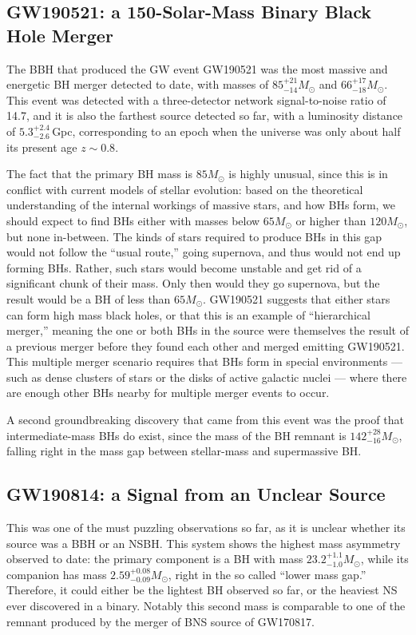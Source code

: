 \documentclass[binding=0.6cm, LaM]{sapthesis}
\begin{document}
\subsection{GW190521: a 150-Solar-Mass Binary Black Hole Merger}
	The BBH that produced the GW event GW190521 was the most massive and energetic BH merger detected to date, 
	with masses of $85^{+21}_{-14}M_{\odot}$ and  $66^{+17}_{-18}M_{\odot}$.
	This event was detected with a three-detector network signal-to-noise ratio of 14.7, 
	and it is also the farthest source detected so far, with a luminosity distance of $5.3^{+2.4}_{-2.6}\,$Gpc,
	corresponding to an epoch when the universe was only about half its present age $z \sim 0.8$.

	The fact that the primary BH mass is $85 M_{\odot}$ is highly unusual, 
	since this is in conflict with current models of stellar evolution:
	based on the theoretical understanding of the internal workings of massive stars, 
	and how BHs form, we should expect to find BHs
	either with masses below $65M_\odot$ or higher than $120M_{\odot}$, but none in-between.
	The kinds of stars required to produce BHs in this gap would not follow the ``usual route,''
	going supernova, and thus would not end up forming BHs. 
	Rather, such stars would become unstable and get rid of a significant chunk of their mass. 
	Only then would they go supernova, but the result would be a BH of less than $65 M_\odot$.
	GW190521 suggests that either stars can form high mass black holes, 
	or that this is an example of ``hierarchical merger,'' 
	meaning the one or both BHs in the source were themselves the result of 
	a previous merger before they found each other and merged emitting GW190521.
	This multiple merger scenario requires that BHs form in special environments
        --- such as dense clusters of stars or the disks of active galactic nuclei --- 
	where there are enough other BHs nearby for multiple merger events to occur.

	A second groundbreaking discovery that came from this event 
	was the proof that intermediate-mass BHs do exist,
	since the mass of the BH remnant is $142^{+28}_{-16}M_\odot$, 
	falling right in the mass gap between stellar-mass and supermassive BH.

\subsection{GW190814: a Signal from an Unclear Source}
\label{subsec:GW190814}
	This was one of the must puzzling observations so far, as it is unclear
	whether its source was a BBH or an NSBH.
	This system shows the highest mass asymmetry observed to date:
	the primary component is a BH with mass $23.2^{+1.1}_{-1.0}M_\odot$, 
	while its companion has mass $2.59^{+0.08}_{-0.09}M_\odot$, right in the so called
	``lower mass gap.''  Therefore, it could either be the lightest BH
	observed so far, or the heaviest NS ever discovered in a binary.
        Notably this second mass is comparable to one of the remnant 
	produced by the merger of BNS source of GW170817.
\end{document}
